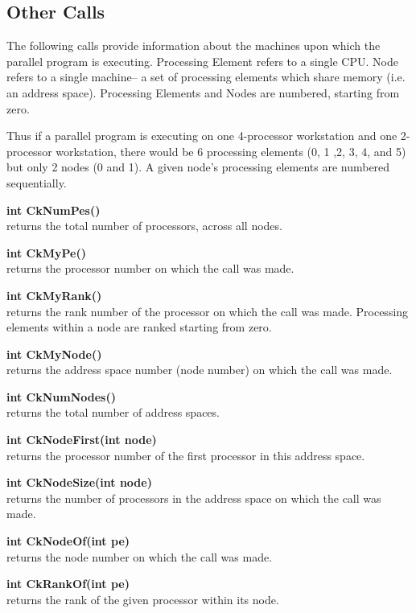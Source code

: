 \subsection{Other Calls}

\label{other Charm++ calls}

The following calls provide information about the machines upon which the
parallel program is executing.  Processing Element refers to a single CPU.
Node refers to a single machine-- a set of processing elements which share
memory (i.e. an address space).  Processing Elements and Nodes are numbered,
starting from zero.

Thus if a parallel program is executing on one 4-processor workstation and one
2-processor workstation, there would be 6 processing elements (0, 1 ,2, 3, 4,
and 5) but only 2 nodes (0 and 1).  A given node's processing elements are
numbered sequentially.

{\bf int CkNumPes()}  \\
returns the total number of processors, across all nodes.

{\bf int CkMyPe()}  \\
returns the processor number on which the call was made.

{\bf int CkMyRank()}  \\
returns the rank number of the processor on which the call was made.
Processing elements within a node are ranked starting from zero.

{\bf int CkMyNode()}  \\
returns the address space number (node number) on which the call was made.

{\bf int CkNumNodes()}  \\
returns the total number of address spaces.

{\bf int CkNodeFirst(int node)}  \\
returns the processor number of the first processor in this address space.

{\bf int CkNodeSize(int node)}  \\
returns the number of processors in the address space on which the call was made.

{\bf int CkNodeOf(int pe)}  \\
returns the node number on which the call was made.

{\bf int CkRankOf(int pe)}  \\
returns the rank of the given processor within its node.

